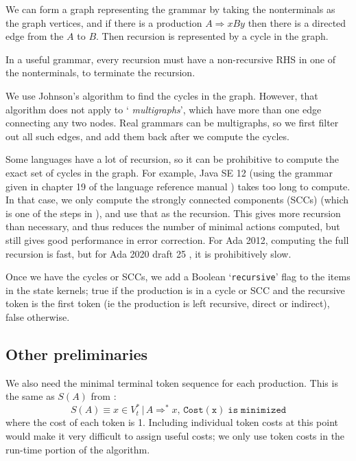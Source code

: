 \documentclass[authordraft]{acmart}
\newcommand{\code}[1]{`\lstinline|#1|'}
\begin{document}
We can form a graph representing the grammar by taking the
nonterminals as the graph vertices, and if there is a production $A
\Rightarrow xBy$ then there is a directed edge from the $A$ to $B$.
Then recursion is represented by a cycle in the graph.

In a useful grammar, every recursion must have a non-recursive
RHS in one of the nonterminals, to terminate the recursion.

We use Johnson's algorithm \citep{graph-cycles} to find the cycles in
the graph. However, that algorithm does not apply to `{\it
  multigraphs}', which have more than one edge connecting any two
nodes. Real grammars can be multigraphs, so we first filter out all
such edges, and add them back after we compute the cycles.

Some languages have a lot of recursion, so it can be prohibitive to
compute the exact set of cycles in the graph. For example, Java SE 12
(using the grammar given in chapter 19 of the language reference
manual \citep{javarm}) takes too long to compute. In that case, we only
compute the strongly connected components (SCCs) (which is one of the
steps in \citet{graph-cycles}), and use that as the recursion. This
gives more recursion than necessary, and thus reduces the number of
minimal actions computed, but still gives good performance in error
correction. For Ada 2012, computing the full recursion is fast, but
for Ada 2020 draft 25 \citep{Ada 2020}, it is prohibitively slow.

Once we have the cycles or SCCs, we add a Boolean \code{recursive}
flag to the items in the state kernels; true if the production is in a
cycle or SCC and the recursive token is the first token (ie the
production is left recursive, direct or indirect), false otherwise.

\subsection{Other preliminaries}
We also need the minimal terminal token sequence for each production.
This is the same as $S(A)$ from \citet{FMQ 1980}:
\begin{equation}
S(A) \equiv x \in V_t^* \, |\, A \Rightarrow^* x, \, \mathtt{Cost(x)\; is\; minimized}
\end{equation}
where the cost of each token is 1. Including individual token costs at
this point would make it very difficult to assign useful costs; we
only use token costs in the run-time portion of the algorithm.
\end{document}
